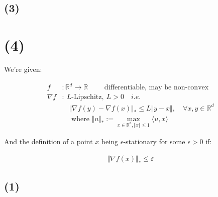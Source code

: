 \documentclass{article}
\begin{document}

\subsection*{(3)}

\section*{(4)}

We're given:

\begin{align*}
    f&: \mathbb{R}^d \to \mathbb{R} \qquad \text{ differentiable, may be non-convex} \\
    \nabla f&: \ L\text{-Lipschitz}, \ L > 0 \quad i.e. \\
    &\quad \Vert \nabla f ( y ) - \nabla f ( x ) \Vert_* \leq L \Vert y - x \Vert , \quad \forall x, y \in \mathbb{R}^d \\
    &\quad \text{ where } \Vert u \Vert_* := \underset{x \in \mathbb{R}^d, \Vert x \Vert \leq 1}{\max} \langle u, x \rangle 
\end{align*}

And the definition of a point $x$ being $\epsilon$-stationary for some $\epsilon > 0$ if:

\begin{align*}
    \Vert \nabla f (x) \Vert_* \leq \varepsilon
\end{align*}

\subsection*{(1)}
\end{document}
